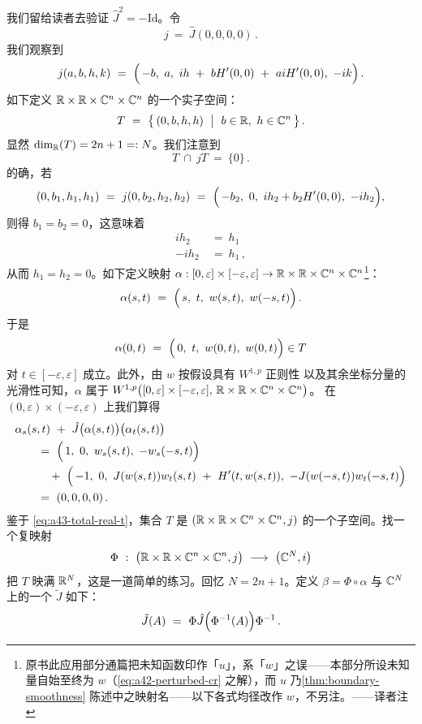 我们留给读者去验证 $\hat{J}^{2}=-\mathrm{Id}$。令
\[
j\ =\ \hat{J}(0,0,0,0)\,.
\]
我们观察到
\[
j(a,b,h,k)\ =\ \Bigl(\,-b,\ a,\ ih\ +\ bH'(0,0)\ +\ aiH'(0,0),\ -ik\Bigr)\,.
\]
如下定义 $\mathbb{R}\times\mathbb{R}\times\mathbb{C}^{n}\times\mathbb{C}^{n}$ 的一个实\trLinear{}子空间：
\[
T\ =\ \bigl\{\,(0,b,h,h)\ \bigm|\ b\in\R,\ h\in\C^{n}\,\bigr\}\,.
\]
显然 $\dim_{\mathbb{R}}(T)=2n+1=:N$。我们注意到
\begin{equation}\label{eq:a43-total-real-t}
T\ \cap\ jT\ =\ \{0\}\,.
\end{equation}
的确，若
\[
(0,b_{1},h_{1},h_{1})\ =\ j(0,b_{2},h_{2},h_{2})\ =\ \Bigl(\,-b_{2},\ 0,\ ih_{2}+b_{2}H'(0,0),\ -ih_{2}\Bigr),
\]
则得 $b_{1}=b_{2}=0$，这意味着
\begin{align*}
ih_{2}\ &=\ h_{1}\\
-ih_{2}\ &=\ h_{1}\,,
\end{align*}
从而 $h_{1}=h_{2}=0$。如下定义映射%
 $\alpha:[0,\varepsilon]\times[-\varepsilon,\varepsilon]\to\mathbb{R}\times\mathbb{R}\times\mathbb{C}^{n}\times\mathbb{C}^{n}$\footnote{原书此应用部分通篇把未知函数印作「$u$」，系「$w$」之误——本部分所设未知量自始至终为 $w$（\eqref{eq:a42-perturbed-cr} 之解），而 $u$ 乃\cref{thm:boundary-smoothness} 陈述中之映射名——以下各式均径改作 $w$，不另注。——译者注}：
\[
\alpha(s,t)\ =\ \Bigl(\,s,\ t,\ w(s,t),\ w(-s,t)\Bigr)\,.
\]
于是
\[
\alpha(0,t)\ =\ \Bigl(\,0,\ t,\ w(0,t),\ w(0,t)\Bigr)\in T
\]
对 $t\in[-\varepsilon,\varepsilon]$ 成立。此外，由 $w$ 按假设具有 $W^{1,p}$ 正则性%
以及其余坐标分量的光滑性可知，$\alpha$ 属于%
 $W^{1,p}\bigl([0,\varepsilon]\times[-\varepsilon,\varepsilon],\,\mathbb{R}\times\mathbb{R}\times\mathbb{C}^{n}\times\mathbb{C}^{n}\bigr)$。%
在 $(0,\varepsilon)\times(-\varepsilon,\varepsilon)$ %
上我们算得
\begin{align*}
&\alpha_{s}(s,t)\ +\ \hat{J}\bigl(\alpha(s,t)\bigr)\bigl(\alpha_{t}(s,t)\bigr)\\
&\qquad=\ \Bigl(\,1,\ 0,\ w_{s}(s,t),\ -w_{s}(-s,t)\Bigr)\\
&\qquad\quad+\ \Bigl(\,-1,\ 0,\ J(w(s,t))w_{t}(s,t)\ +\ H'(t,w(s,t)),\ -J(w(-s,t))w_{t}(-s,t)\Bigr)\\
&\qquad=\ (0,0,0,0)\,.
\end{align*}
鉴于 \eqref{eq:a43-total-real-t}，集合 $T$ 是 $(\mathbb{R}\times\mathbb{R}\times\mathbb{C}^{n}\times\mathbb{C}^{n},j)$ %
的一个\trTotallyReal{}子空间。找一个复\trLinear{}映射
\[
\Phi\ :\ \bigl(\R\times\R\times\C^{n}\times\C^{n},j\bigr)\ \longrightarrow\ \bigl(\C^{N},i\bigr)
\]
把 $T$ 映满 $\mathbb{R}^{N}$，这是一道简单的练习。回忆 $N=2n+1$。定义 $\beta=\Phi\circ\alpha$ %
与 $\mathbb{C}^{N}$ 上的一个\trAlmostComplexStructure{} $\tilde{J}$ 如下：
\[
\tilde{J}(A)\ =\ \Phi\hat{J}\Bigl(\Phi^{-1}(A)\Bigr)\Phi^{-1}\,.
\]
